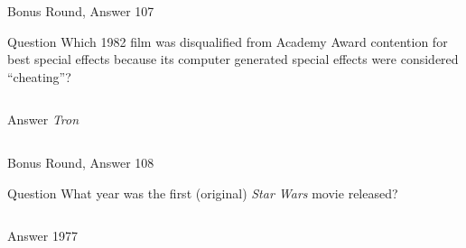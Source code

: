 \documentclass[11pt]{beamer}
\begin{document}
\begin{frame}[t]{Bonus Round, Answer 107}
  \vspace{2em}
  \begin{block}{Question}
    Which 1982 film was disqualified from Academy Award contention for best special effects because its computer generated special effects were considered ``cheating''?
  \end{block}
  \pause{}
  \begin{columns}[T,totalwidth=\linewidth]
    \begin{column}{0.35\linewidth}
      \begin{block}{Answer}
        \emph{Tron}
      \end{block}
    \end{column}
    \begin{column}{0.6\linewidth}
      \begin{center}
        \texttt{[image: \{Images/tron]}.jpg}
      \end{center}
    \end{column}
  \end{columns}
\end{frame}


\begin{frame}[t]{Bonus Round, Answer 108}
  \vspace{2em}
  \begin{block}{Question}
    What year was the first (original) \emph{Star Wars} movie released?
  \end{block}
  \pause{}
  \begin{columns}[T,totalwidth=\linewidth]
    \begin{column}{0.35\linewidth}
      \begin{block}{Answer}
        1977
      \end{block}
    \end{column}
    \begin{column}{0.6\linewidth}
      \begin{center}
        \texttt{[image: \{Images/starwars]}.jpg}
      \end{center}
    \end{column}
  \end{columns}
\end{frame}
\end{document}
